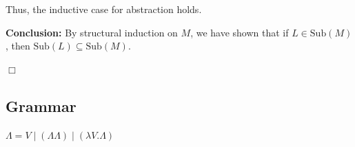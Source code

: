 \documentclass{article}
\begin{document}
Thus, the inductive case for abstraction holds.

\medskip

\noindent \textbf{Conclusion:} By structural induction on $M$, we have shown that if $L \in \text{Sub}(M)$, then $\text{Sub}(L) \subseteq \text{Sub}(M)$.

\hfill $\Box$

\subsection{Grammar}

$\Lambda = V \mid (\Lambda\Lambda) \mid (\lambda V.\Lambda) $
\end{document}
